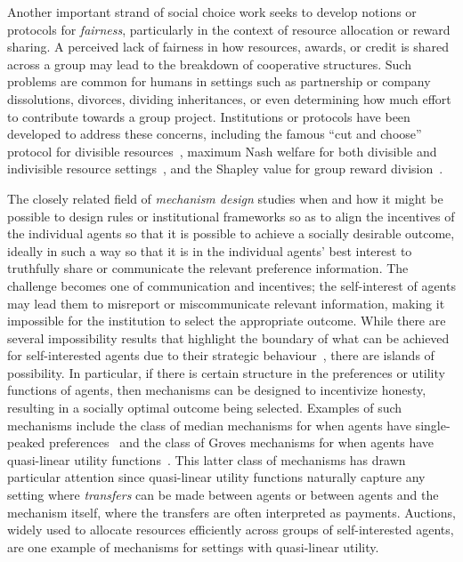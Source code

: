 \documentclass[11pt, a4paper, logo, onecolumn, nonumbering]{deepmind}
\begin{document}
Another important strand of social choice work seeks to develop notions or protocols for \textit{fairness},  
particularly in the context of resource allocation or reward sharing.
A perceived lack of fairness in how resources, awards, or credit is shared across a group may lead to the breakdown of cooperative structures.
Such problems are common for humans in settings such as partnership or company dissolutions, divorces, dividing inheritances, or even determining how much effort to contribute towards a group project. Institutions or protocols have been developed to address these concerns, including the famous ``cut and choose'' protocol for divisible resources~\cite{brams1996fair,aziz2016discrete}, maximum Nash welfare for both divisible and indivisible resource settings~\cite{nash1950bargaining,caragiannis2019unreasonable}, and the Shapley value for group reward division~\cite{shapley1953value}. 


The closely related field of \textit{mechanism design} studies when and how it might be possible to design rules or institutional frameworks so as to align the incentives of the individual agents so that it is possible to achieve a socially desirable outcome, ideally in such a way so that it is in the individual agents' best interest to truthfully share or communicate the relevant preference information.
The challenge becomes one of communication and incentives; the self-interest of agents may lead them to misreport or miscommunicate relevant information, making it impossible for the institution  to select the appropriate outcome.
While there are several impossibility results that highlight the boundary of what can be achieved for self-interested agents due to their strategic behaviour~\cite{arrow1951social,gibbard1973manipulation,satterthwaite1975strategy,green1977characterization,roberts1979characterization},
there are islands of possibility. In particular, if there is certain structure in the preferences or utility functions of agents, then mechanisms can be designed to incentivize honesty, resulting in a socially optimal outcome being selected. Examples of such mechanisms include the class of median mechanisms for when agents have single-peaked preferences~\cite{black1958theory} and the class of Groves mechanisms for when agents have quasi-linear utility functions~\cite{groves1973incentives,vickrey1961counterspeculation,clarke1971multipart}.
This latter class of mechanisms has drawn particular attention since quasi-linear utility functions naturally capture any setting where \emph{transfers} can be made between agents or between agents and the mechanism itself, where the transfers are often interpreted as payments. Auctions, widely used to allocate resources efficiently across groups of self-interested agents, are one example of mechanisms for settings with quasi-linear utility. 
\end{document}
